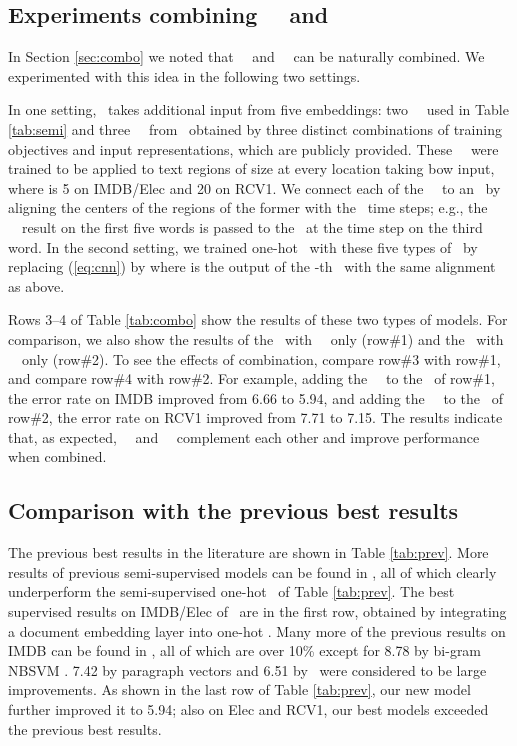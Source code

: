 \documentclass{article}
\begin{document}
\subsection{Experiments combining \cnn\ \tvEmbs\ and \lstm\ \tvEmbs}
\label{sec:comboexp}
In Section \ref{sec:combo} we noted that \lstm\ \tvEmbs\ and \cnn\ \tvEmbs\ 
can be naturally combined.  
We experimented with this idea in the following two settings.  

In one setting, 
\ohBiLstm\ takes additional input from five embeddings: two \lstm\ \tvEmbs\ used in Table \ref{tab:semi} 
and three \cnn\ \tvEmbs\ from \JZb\ 
obtained by three distinct combinations of 
training objectives and input representations, 
which are 
publicly provided.
These \cnn\ \tvEmbs\ were trained to be applied to text regions of size  at every location taking bow input, 
where  is 5 on IMDB/Elec and 20 on RCV1.  
We connect each of the \cnn\ \tvEmbs\ to an \lstm\ by aligning the centers 
of the regions of the former with the \lstm\ time steps; 
e.g., the \cnn\ \tvEmb\ result on 
the first five words is passed to the \lstm\ at the time step on the third word. 
In the second setting, 
we trained one-hot \cnn\ with these five types of \tvEmbs\ 
by replacing (\ref{eq:cnn}) 
 by 
 where 
 is the output of the -th \tvEmb\ 
with the same alignment as above. 

Rows 3--4 of Table \ref{tab:combo} show the results of these two types of models.  
For comparison, we also show the results of 
the \lstm\ 
with \lstm\ \tvEmbs\ only 
(row\#1) and 
the \cnn\ 
with \cnn\ \tvEmbs\ only (row\#2). 
To see the effects of combination, compare row\#3 with row\#1, and compare row\#4 with row\#2.  
For example, 
adding the \cnn\ \tvEmbs\ to 
the \lstm\ 
of row\#1, the error rate on IMDB improved 
from 6.66 to 5.94, and 
adding the \lstm\ \tvEmbs\ to 
the \cnn\ 
of row\#2, the error rate on RCV1 improved 
from 7.71 to 7.15.  
The results indicate that, as expected, 
\lstm\ \tvEmbs\ and \cnn\ \tvEmbs\ complement each other and 
improve performance when combined.   

\subsection{Comparison with the previous best results} 
The previous best results in the literature are shown in Table \ref{tab:prev}.
More results of previous semi-supervised models can be found in \JZb, 
all of which clearly underperform the semi-supervised one-hot \cnn\ of Table \ref{tab:prev}.  
The best supervised results on IMDB/Elec of \JZa\ are in the first row, obtained by 
integrating a document embedding layer into one-hot \cnn.  
Many more of the previous results on IMDB can be found in \cite{LM14}, all of which are over 10\% 
except for 8.78 by bi-gram NBSVM \cite{WM12}.  
7.42 by paragraph vectors \cite{LM14} and 6.51 by \JZb\ were considered to be large improvements.  
As shown in the last row of Table \ref{tab:prev}, 
our new model further improved it to 5.94; 
also on Elec and RCV1, our best models exceeded the previous best results.  
\end{document}
